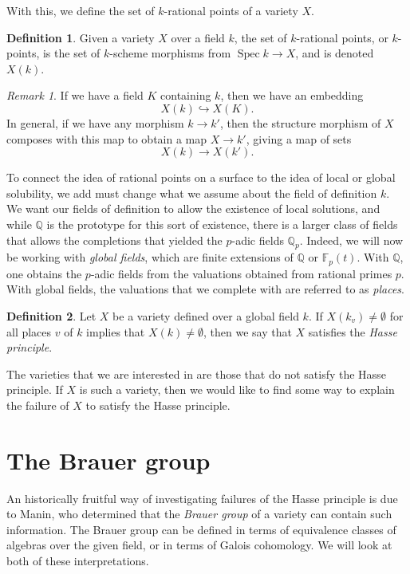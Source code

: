 \documentclass[12pt,twoside]{reedthesis}
\theoremstyle{plain}
\theoremstyle{definition}
\newtheorem{definition}{Definition}[section]
\theoremstyle{remark}
\newtheorem{remark}{Remark}[section]
\newcommand{\QQ}{\mathbb{Q}}
\newcommand{\FF}{\mathbb{F}}
\newcommand{\Spec}{\operatorname{Spec}}
\begin{document}
With this, we define the set of $k$-rational points of a variety $X$.

\begin{definition}
Given a variety $X$ over a field $k$, the set of $k$-rational points, or $k$-points, is the set of $k$-scheme morphisms from $\Spec k\to X$, and is denoted $X(k)$.
\end{definition}
\begin{remark}
If we have a field $K$ containing $k$, then we have an embedding \[X(k)\hookrightarrow X(K).\] In general, if we have any morphism $k\to k'$, then the structure morphism of $X$ composes with this map to obtain a map $X\to k'$, giving a map of sets \[X(k)\to X(k').\]
\end{remark}
To connect the idea of rational points on a surface to the idea of local or global solubility, we add must change what we assume about the field of definition $k$. We want our fields of definition to allow the existence of local solutions, and while $\QQ$ is the prototype for this sort of existence, there is a larger class of fields that allows the completions that yielded the $p$-adic fields $\QQ_p$. Indeed, we will now be working with \emph{global fields}, which are finite extensions of $\QQ$ or $\FF_p(t)$. With $\QQ$, one obtains the $p$-adic fields from the valuations obtained from rational primes $p$. With global fields, the valuations that we complete with are referred to as \emph{places}.
\begin{definition}
Let $X$ be a variety defined over a global field $k$. If $X(k_v)\neq\emptyset$ for all places $v$ of $k$ implies that $X(k)\neq\emptyset$, then we say that $X$ satisfies the \emph{Hasse principle}.
\end{definition}
The varieties that we are interested in are those that do not satisfy the Hasse principle. If $X$ is such a variety, then we would like to find some way to explain the failure of $X$ to satisfy the Hasse principle.
\section{The Brauer group}
An historically fruitful way of investigating failures of the Hasse principle is due to Manin, who determined that the \emph{Brauer group} of a variety can contain such information. The Brauer group can be defined in terms of equivalence classes of algebras over the given field, or in terms of Galois cohomology. We will look at both of these interpretations.
\end{document}
